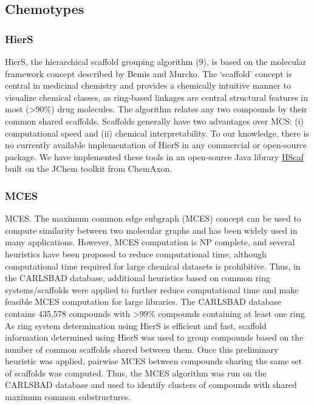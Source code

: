 \subsection{Chemotypes}

\subsubsection{HierS}

HierS, the hierarchical scaffold grouping algorithm\cite{Wilkens2005-ja} (9), is based on the molecular framework concept described by Bemis and Murcko\cite{Bemis1996-jg}. The ‘scaffold’ concept is central in medicinal chemistry and provides a chemically intuitive manner to visualize chemical classes, as ring-based linkages are central structural features in most (\textgreater 90\%) drug molecules. The algorithm relates any two compounds by their common shared scaffolds. Scaffolds generally have two advantages over MCS: (i) computational speed and (ii) chemical interpretability. To our knowledge, there is no currently available implementation of HierS in any commercial or open-source package. We have implemented these tools in an open-source Java library \href{https://github.com/unmtransinfo/unm_biocomp_hscaf}{HScaf}\cite{Yang2012-qd} built on the JChem toolkit from ChemAxon.

\subsubsection{MCES}

MCES. The maximum common edge subgraph (MCES) concept\cite{Raymond2002-ep} can be used to compute similarity between two molecular graphs and has been widely used in many applications\cite{Stahl2005-bl,Sheridan2006-nx,Gardiner2007-ur,Bocker2008-uh,Hariharan2011-qx,Bostrom2012-fb}. However, MCES computation is NP complete, and several heuristics have been proposed to reduce computational time, although computational time required for large chemical datasets is prohibitive. Thus, in the CARLSBAD database, additional heuristics based on common ring systems/scaffolds were applied to further reduce computational time and make feasible MCES computation for large libraries. The CARLSBAD database contains 435,578 compounds with \textgreater99\% compounds containing at least one ring. As ring system determination using HierS is efficient and fast, scaffold information determined using HierS was used to group compounds based on the number of common scaffolds shared between them. Once this preliminary heuristic was applied, pairwise MCES between compounds sharing the same set of scaffolds was computed. Thus, the MCES algorithm was run on the CARLSBAD database and used to identify clusters of compounds with shared maximum common substructures.

